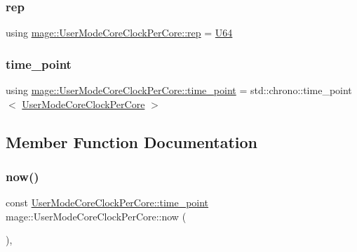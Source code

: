 \hypertarget{structmage_1_1_user_mode_core_clock_per_core_a287b38a7811aa8bb1a1829ac316acd09}{}\label{structmage_1_1_user_mode_core_clock_per_core_a287b38a7811aa8bb1a1829ac316acd09} 
\subsubsection{\texorpdfstring{rep}{rep}}
{\footnotesize\ttfamily using \hyperlink{structmage_1_1_user_mode_core_clock_per_core_a287b38a7811aa8bb1a1829ac316acd09}{mage\+::\+User\+Mode\+Core\+Clock\+Per\+Core\+::rep} =  \hyperlink{namespacemage_a6672cf3c861707ce4a3235a3eb43941d}{U64}}

\hypertarget{structmage_1_1_user_mode_core_clock_per_core_a52312b09168e0f4a8cace07d94be5427}{}\label{structmage_1_1_user_mode_core_clock_per_core_a52312b09168e0f4a8cace07d94be5427} 
\subsubsection{\texorpdfstring{time\+\_\+point}{time\_point}}
{\footnotesize\ttfamily using \hyperlink{structmage_1_1_user_mode_core_clock_per_core_a52312b09168e0f4a8cace07d94be5427}{mage\+::\+User\+Mode\+Core\+Clock\+Per\+Core\+::time\+\_\+point} =  std\+::chrono\+::time\+\_\+point$<$ \hyperlink{structmage_1_1_user_mode_core_clock_per_core}{User\+Mode\+Core\+Clock\+Per\+Core} $>$}



\subsection{Member Function Documentation}
\hypertarget{structmage_1_1_user_mode_core_clock_per_core_a5f9f29750756c11bcb979c14cf525a42}{}\label{structmage_1_1_user_mode_core_clock_per_core_a5f9f29750756c11bcb979c14cf525a42} 
\subsubsection{\texorpdfstring{now()}{now()}}
{\footnotesize\ttfamily const \hyperlink{structmage_1_1_user_mode_core_clock_per_core_a52312b09168e0f4a8cace07d94be5427}{User\+Mode\+Core\+Clock\+Per\+Core\+::time\+\_\+point} mage\+::\+User\+Mode\+Core\+Clock\+Per\+Core\+::now (\begin{DoxyParamCaption}{ }\end{DoxyParamCaption})\hspace{0.3cm}{\ttfamily [static]}, {\ttfamily [noexcept]}}



